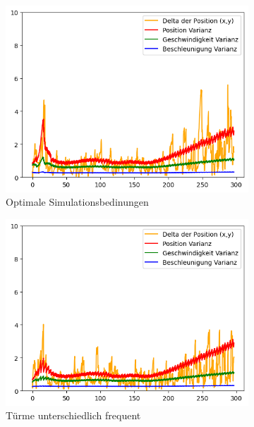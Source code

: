 \begin{figure}
    \begin{subfigure}{.333\textwidth}
        \centering
        \includegraphics[width=.9\linewidth]{Ergebnisse/plots_ungenauigkeiten/distanz/distanz_const_vel_flag_freq.png}
        \caption{Optimale Simulationsbedinungen}
    \end{subfigure}    
    \begin{subfigure}{.333\textwidth}
        \centering
        \includegraphics[width=.9\linewidth]{Ergebnisse/plots_ungenauigkeiten/distanz/distanz_const_vel_freq.png}
        \caption{Türme unterschiedlich frequent}
    \end{subfigure}    
    \begin{subfigure}{.333\textwidth}
        \centering

\end{subfigure}
\end{figure}
